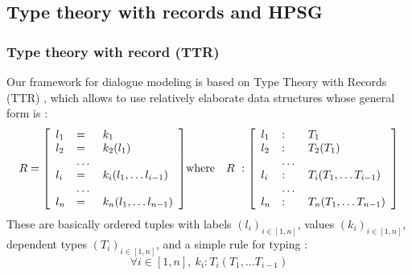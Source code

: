 \documentclass[11pt]{article}
\begin{document}
		

		\subsection{Type theory with records and HPSG}
			\subsubsection{Type theory with record (TTR)}
				Our framework for dialogue modeling is based on Type Theory with Records (TTR) \cite{betarte1998, cooper2005, cooper2015}, which allows to use relatively elaborate data structures whose general form is :
				\begin{eqnarray}
					R = \left[
					\begin{array}{l l l}
					l_1 &=& k_1 \\
					l_2 &=& k_2(l_1) \\
					&\dots& \\
					l_i &=& k_i(l_1, \dots l_{i-1}) \\
					&\dots& \\
					l_n &=& k_n(l_1, \dots l_{n-1})
					\end{array}
					\right]
					&\mbox{where}&
					R \ : \left[
					\begin{array}{l l l}
					l_1 &:& T_1 \\
					l_2 &:& T_2(T_1) \\
					&\dots& \\
					l_i &:& T_i(T_1, \dots T_{i-1}) \\
					&\dots& \\
					l_n &:& T_n(T_1, \dots T_{n-1})
					\end{array}
					\right]
					\label{record_def}
				\end{eqnarray}
				These are basically ordered tuples with labels $(l_i)_{i\in[1, n]}$, values $(k_i)_{i\in[1, n]}$, dependent types $(T_i)_{i\in[1, n]}$, and a simple rule for typing :
				\begin{equation*}
					\forall i \in [1, n], \ k_i : T_i(T_1, \dots T_{i-1})
					\label{record_typing}
				\end{equation*}
\end{document}
